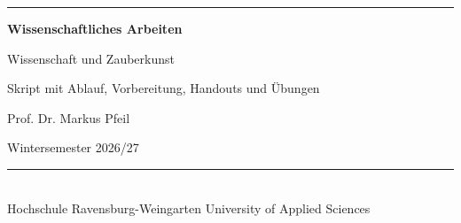\thispagestyle{empty}
\enlargethispage{10cm}
{\sffamily
\vspace*{-8mm}
\rwulogo[height=2.2cm]

\vspace*{6.0cm}
{\color{rwuviolet}\rule{\textwidth}{0.8mm}}

\vspace*{8mm}
{\fontsize{32}{38}\selectfont\bfseries\color{rwuviolet} Wissenschaftliches Arbeiten}

\vspace*{4mm}
{\LARGE\color{rwucyandark} Wissenschaft und Zauberkunst}

\vspace*{3mm}
{\Large Skript mit Ablauf, Vorbereitung, Handouts und Übungen}

\vspace*{12mm}
{\large Prof. Dr. Markus Pfeil}

\vspace*{6mm}
{\large Wintersemester 2026/27}

\vfill
{\color{rwucyan}\rule{\textwidth}{0.4mm}}\\[2mm]
{\small\color{rwugray} Hochschule Ravensburg-Weingarten University of Applied Sciences}
}
\newpage

